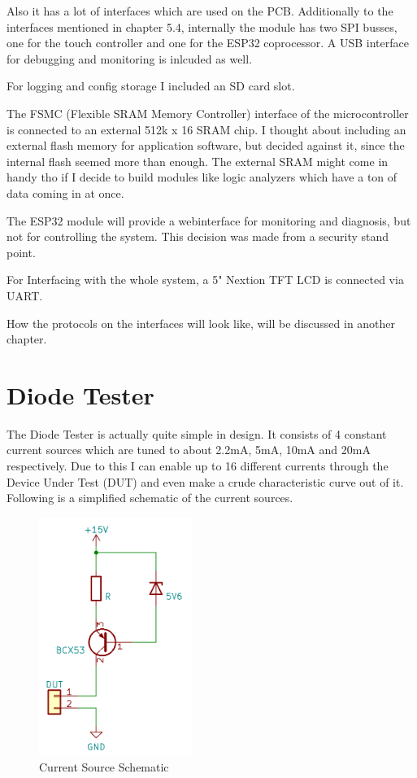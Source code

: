 Also it has a lot of interfaces which are used on the PCB. Additionally to the interfaces mentioned in chapter 5.4, internally the module has two SPI busses, one for the touch controller and one for the ESP32 coprocessor. A USB interface for debugging and monitoring is inlcuded as well. 

For logging and config storage I included an SD card slot. 

The FSMC (Flexible SRAM Memory Controller) interface of the microcontroller is connected to an external 512k x 16 SRAM chip. I thought about including an external flash memory for application software, but decided against it, since the internal flash seemed more than enough. The external SRAM might come in handy tho if I decide to build modules like logic analyzers which have a ton of data coming in at once. 

The ESP32 module will provide a webinterface for monitoring and diagnosis, but not for controlling the system. This decision was made from a security stand point. 

For Interfacing with the whole system, a 5" Nextion TFT LCD is connected via UART. 

How the protocols on the interfaces will look like, will be discussed in another chapter. 


\section{Diode Tester}
The Diode Tester is actually quite simple in design. It consists of 4 constant current sources which are tuned to about 2.2mA, 5mA, 10mA and 20mA respectively. Due to this I can enable up to 16 different currents through the Device Under Test (DUT) and even make a crude characteristic curve out of it. 
Following is a simplified schematic of the current sources.

\begin{figure}[H]
	\centering
		\includegraphics[width=5cm]{pictures/cc_source.png}
	\caption{Current Source Schematic}
	\label{img:CC_Diode}
\end{figure}

